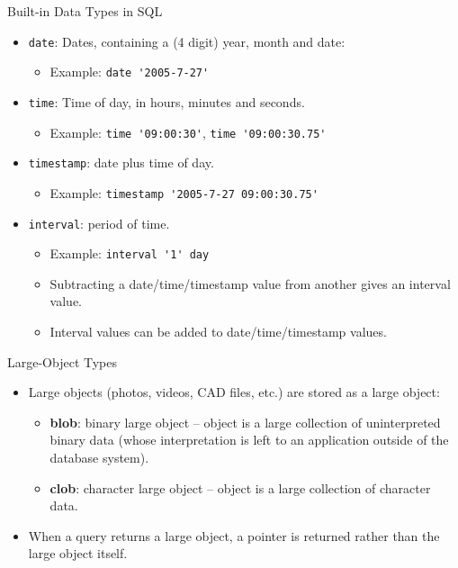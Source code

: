 \documentclass{beamer}
\begin{document}
\begin{frame}[fragile]{Built-in Data Types in SQL}
    \begin{itemize}
        \item \texttt{date}: Dates, containing a (4 digit) year, month and date:
        \begin{itemize}
            \item Example: \verb|date '2005-7-27'|
        \end{itemize}
        \item \texttt{time}: Time of day, in hours, minutes and seconds.
        \begin{itemize}
            \item Example: \verb|time '09:00:30'|,  \verb|time '09:00:30.75'|
        \end{itemize}
        \item \texttt{timestamp}: date plus time of day.
        \begin{itemize}
            \item Example: \verb|timestamp '2005-7-27 09:00:30.75'|
        \end{itemize}
        \item \texttt{interval}: period of time.
        \begin{itemize}
            \item Example: \verb|interval '1' day|
            \item Subtracting a date/time/timestamp value from another gives an interval value.
            \item Interval values can be added to date/time/timestamp values.
        \end{itemize}
    \end{itemize}
\end{frame}

\begin{frame}{Large-Object Types}
    \begin{itemize}
        \item Large objects (photos, videos, CAD files, etc.) are stored as a large object:
        \begin{itemize}
            \item \textbf{blob}: binary large object -- object is a large collection of uninterpreted binary data (whose interpretation is left to an application outside of the database system).
            \item \textbf{clob}: character large object -- object is a large collection of character data.
        \end{itemize}
        \item When a query returns a large object, a pointer is returned rather than the large object itself.
    \end{itemize}
\end{frame}
\end{document}
